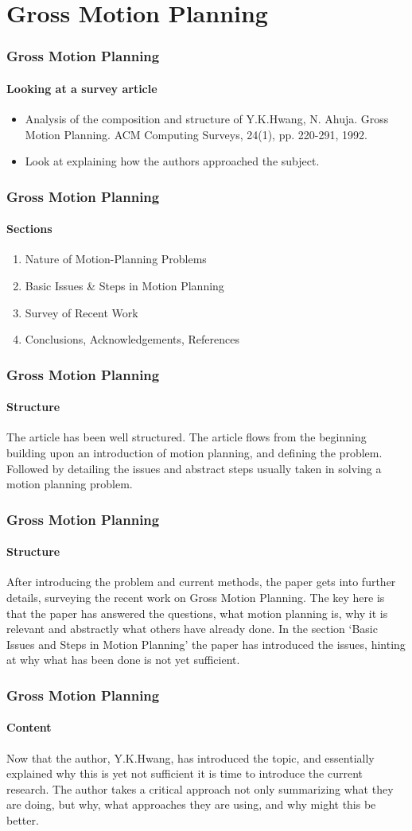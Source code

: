 \section{Gross Motion Planning}

\begin{frame}
    \frametitle{Gross Motion Planning}
    \framesubtitle{Looking at a survey article}
	\begin{itemize}
	\item Analysis of the composition and structure of Y.K.Hwang, N. Ahuja. Gross Motion Planning. ACM Computing Surveys, 24(1), pp. 220-291, 1992. 
     \item Look at explaining how the authors approached the subject.
     \end{itemize}
\end{frame}

\begin{frame}
    \frametitle{Gross Motion Planning}
    \framesubtitle{Sections}
	\begin{enumerate}
	\item Nature of Motion-Planning Problems
	\item Basic Issues \& Steps in Motion Planning
	\item Survey of Recent Work
	\item Conclusions, Acknowledgements, References
	\end{enumerate}	    
\end{frame}


\begin{frame}
    \frametitle{Gross Motion Planning}
    \framesubtitle{Structure}
    The article has been well structured. The article flows from the beginning building upon an introduction of motion planning, and defining the problem. Followed by detailing the issues and abstract steps usually taken in solving a motion planning problem. 
\end{frame}

\begin{frame}
    \frametitle{Gross Motion Planning}
    \framesubtitle{Structure}
    After introducing the problem and current methods, the paper gets into further details, surveying the recent work on Gross Motion Planning. The key here is that the paper has answered the questions, what motion planning is, why it is relevant and abstractly what others have already done. In the section `Basic Issues and Steps in Motion Planning' the paper has introduced the issues, hinting at why what has been done is not yet sufficient.   
\end{frame}

\begin{frame}
    \frametitle{Gross Motion Planning}
    \framesubtitle{Content}
    Now that the author, Y.K.Hwang, has introduced the topic, and essentially explained why this is yet not sufficient it is time to introduce the current research. The author takes a critical approach not only summarizing what they are doing, but why, what approaches they are using, and why might this be better. 
\end{frame}